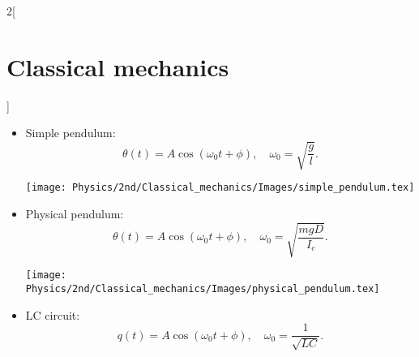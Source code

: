\documentclass[../../../main.tex]{subfiles}
\begin{document}
\begin{multicols}{2}[\section{Classical mechanics}]
\begin{prop}[Examples]
\begin{itemize}
            \begin{minipage}{\linewidth}
              \centering
              \texttt{[image: Physics/2nd/Classical\_mechanics/Images/springs.tex]}
            \end{minipage}
      \item Simple pendulum: $$\theta(t)=A\cos(\omega_0t+\phi),\quad\omega_0=\sqrt{\frac{g}{l}}.$$
            \begin{minipage}{\linewidth}
              \centering
              \texttt{[image: Physics/2nd/Classical\_mechanics/Images/simple\_pendulum.tex]}
            \end{minipage}
      \item Physical pendulum:
            $$\theta(t)=A\cos(\omega_0t+\phi),\quad\omega_0=\sqrt{\frac{mgD}{I_e}}.$$
            \begin{minipage}{\linewidth}
              \centering
              \texttt{[image: Physics/2nd/Classical\_mechanics/Images/physical\_pendulum.tex]}
            \end{minipage}
      \item LC circuit: $$q(t)=A\cos(\omega_0t+\phi),\quad\omega_0=\frac{1}{\sqrt{LC}}.$$
    \end{itemize}
  \end{prop}

\end{multicols}
\end{document}
